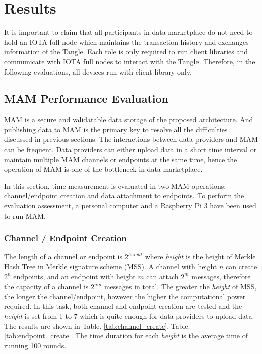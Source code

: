 \documentclass[journal,article,applsci,submit,moreauthors,pdftex]{Definitions/mdpi}
\begin{document}
\section{Results}
It is important to claim that all participants in data marketplace do not need to hold an IOTA full node which maintains the transaction history and exchanges information of the Tangle. Each role is only required to run client libraries and communicate with IOTA full nodes to interact with the Tangle. Therefore, in the following evaluations, all devices run with client library only.

\subsection{MAM Performance Evaluation}
MAM is a secure and validatable data storage of the proposed architecture. And publishing data to MAM is the primary key to resolve all the difficulties discussed in previous sections. The interactions between data providers and MAM can be frequent. Data providers can either upload data in a short time interval or maintain multiple MAM channels or endpoints at the same time, hence the operation of MAM is one of the bottleneck in data marketplace.

In this section, time measurement is evaluated in two MAM operations: channel/endpoint creation and data attachment to endpoints. To perform the evaluation assessment, a personal computer and a Raspberry Pi 3 have been used to run MAM. 

\subsubsection{Channel / Endpoint Creation}
The length of a channel or endpoint is $2^{height}$ where \textit{height} is the height of Merkle Hash Tree in Merkle signature scheme (MSS). A channel with height $n$ can create $2^n$ endpoints, and an endpoint with height $m$ can attach $2^m$ messages, therefore the capacity of a channel is $2^{nm}$ messages in total. The greater the \textit{height} of MSS, the longer the channel/endpoint, however the higher the computational power required. In this task, both channel and endpoint creation are tested and the \textit{height} is set from 1 to 7 which is quite enough for data providers to upload data. The results are shown in Table.  \ref{tab:channel_create}, Table. \ref{tab:endpoint_create}. The time duration for each \textit{height} is the average time of running 100 rounds.
\end{document}
